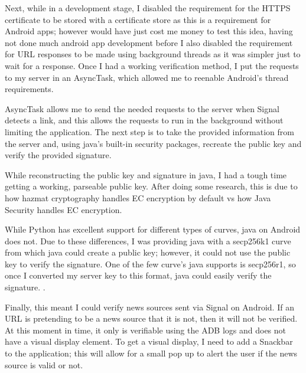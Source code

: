 \documentclass[11pt,a4paper]{report}
\begin{document}
Next, while in a development stage, I disabled the requirement for the HTTPS certificate to be stored with a certificate store as this is a requirement for Android apps; however would have just cost me money to test this idea, having not done much android app development before I also disabled the requirement for URL responses to be made using background threads as it was simpler just to wait for a response. Once I had a working verification method, I put the requests to my server in an AsyncTask, which allowed me to reenable Android’s thread requirements.

AsyncTask allows me to send the needed requests to the server when Signal detects a link, and this allows the requests to run in the background without limiting the application. The next step is to take the provided information from the server and, using java’s built-in security packages, recreate the public key and verify the provided signature.

While reconstructing the public key and signature in java, I had a tough time getting a working, parseable public key. After doing some research, this is due to how hazmat cryptography handles EC encryption by default vs how Java Security handles EC encryption.

While Python has excellent support for different types of curves, java on Android does not. Due to these differences, I was providing java with a secp256k1 curve from which java could create a public key; however, it could not use the public key to verify the signature. One of the few curve’s java supports is secp256r1, so once I converted my server key to this format, java could easily verify the signature. \citep{Exception}.

Finally, this meant I could verify news sources sent via Signal on Android. If an URL is pretending to be a news source that it is not, then it will not be verified. At this moment in time, it only is verifiable using the ADB logs and does not have a visual display element. To get a visual display, I need to add a Snackbar to the application; this will allow for a small pop up to alert the user if the news source is valid or not.
\newpage
\end{document}
